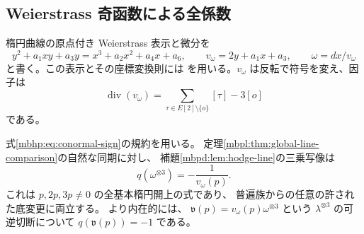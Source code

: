 \subsection{Weierstrass 奇函数による全係数}

楕円曲線の原点付き Weierstrass 表示と微分を
\[
 y^2+a_1xy+a_3y=x^3+a_2x^2+a_4x+a_6,\qquad
 v_\omega=2y+a_1x+a_3,\qquad \omega=dx/v_\omega
\]
と書く。この表示とその座標変換則には
\cite[Chapter~III, \S1, Table~3.1; \S5]{NFMSilvermanArithmetic}
を用いる。$v_\omega$ は反転で符号を変え、因子は
\[
 \operatorname{div}(v_\omega)
   =\sum_{\tau\in E[2]\setminus\{o\}}[\tau]-3[o]
\]
である。

\begin{theorem}[自然な同期に対する一因子周期の全係数]
\label{mbhp:thm:period-formula}
式\eqref{mbhp:eq:conormal-sign}の規約を用いる。
定理\ref{mbpl:thm:global-line-comparison}の自然な同期に対し、
補題\ref{mbpd:lem:hodge-line}の三乗写像は
\begin{equation}\label{mbhp:eq:period-formula}
 q(\omega^{\otimes3})=-\frac1{v_\omega(p)}.
\end{equation}
これは $p,2p,3p\ne0$ の全基本楕円開上の式であり、
普遍族からの任意の許された底変更に両立する。
より内在的には、
$\mathfrak v(p)=v_\omega(p)\omega^{\otimes3}$
という $\lambda^{\otimes3}$ の可逆切断について
$q(\mathfrak v(p))=-1$ である。
\end{theorem}
